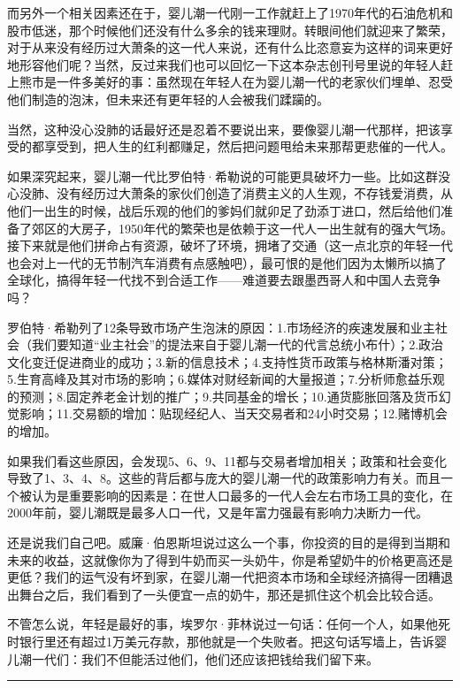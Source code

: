 而另外一个相关因素还在于，婴儿潮一代刚一工作就赶上了1970年代的石油危机和股市低迷，那个时候他们还没有什么多余的钱来理财。转眼间他们就迎来了繁荣，对于从来没有经历过大萧条的这一代人来说，还有什么比恣意妄为这样的词来更好地形容他们呢？当然，反过来我们也可以回忆一下这本杂志创刊号里说的年轻人赶上熊市是一件多美好的事：虽然现在年轻人在为婴儿潮一代的老家伙们埋单、忍受他们制造的泡沫，但未来还有更年轻的人会被我们蹂躏的。

当然，这种没心没肺的话最好还是忍着不要说出来，要像婴儿潮一代那样，把该享受的都享受到，把人生的红利都赚足，然后把问题甩给未来那帮更悲催的一代人。

如果深究起来，婴儿潮一代比罗伯特·希勒说的可能更具破坏力一些。比如这群没心没肺、没有经历过大萧条的家伙们创造了消费主义的人生观，不存钱爱消费，从他们一出生的时候，战后乐观的他们的爹妈们就卯足了劲添丁进口，然后给他们准备了郊区的大房子，1950年代的繁荣也是依赖于这一代人一出生就有的强大气场。接下来就是他们拼命占有资源，破坏了环境，拥堵了交通（这一点北京的年轻一代也会对上一代的无节制汽车消费有点感触吧），最可恨的是他们因为太懒所以搞了全球化，搞得年轻一代找不到合适工作------难道要去跟墨西哥人和中国人去竞争吗？

罗伯特·希勒列了12条导致市场产生泡沫的原因：1.市场经济的疾速发展和业主社会（我们要知道``业主社会''的提法来自于婴儿潮一代的代言总统小布什）；2.政治文化变迁促进商业的成功；3.新的信息技术；4.支持性货币政策与格林斯潘对策；5.生育高峰及其对市场的影响；6.媒体对财经新闻的大量报道；7.分析师愈益乐观的预测；8.固定养老金计划的推广；9.共同基金的增长；10.通货膨胀回落及货币幻觉影响；11.交易额的增加：贴现经纪人、当天交易者和24小时交易；12.赌博机会的增加。

如果我们看这些原因，会发现5、6、9、11都与交易者增加相关；政策和社会变化导致了1、3、4、8。这些的背后都与庞大的婴儿潮一代的政策影响力有关。而且一个被认为是重要影响的因素是：在世人口最多的一代人会左右市场工具的变化，在2000年前，婴儿潮既是最多人口一代，又是年富力强最有影响力决断力一代。

还是说我们自己吧。威廉·伯恩斯坦说过这么一个事，你投资的目的是得到当期和未来的收益，这就像你为了得到牛奶而买一头奶牛，你是希望奶牛的价格更高还是更低？我们的运气没有坏到家，在婴儿潮一代把资本市场和全球经济搞得一团糟退出舞台之后，我们看到了一头便宜一点的奶牛，那还是抓住这个机会比较合适。

不管怎么说，年轻是最好的事，埃罗尔·菲林说过一句话：任何一个人，如果他死时银行里还有超过1万美元存款，那他就是一个失败者。把这句话写墙上，告诉婴儿潮一代们：我们不但能活过他们，他们还应该把钱给我们留下来。

\begin{center}\rule{3in}{0.4pt}\end{center}

